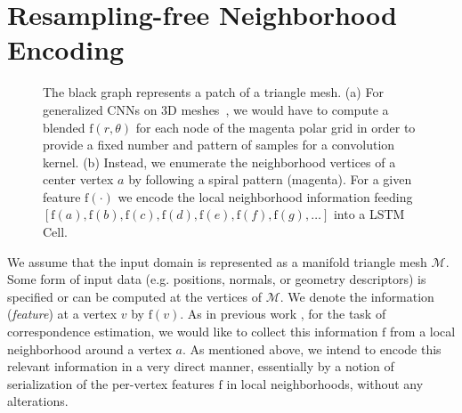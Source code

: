 \documentclass[runningheads]{llncs}
\begin{document}
\section{Resampling-free Neighborhood Encoding}
\begin{figure}[tb]
\centering
{}
\caption{The black graph represents a patch of a triangle mesh. 
(a) For generalized CNNs on 3D meshes~\cite{masci2015geodesic,boscaini2016learning,monti2017geometric}, we would have to compute a blended $\mathrm{f}(r,\theta)$ for each node of the magenta polar grid in order to provide a fixed number and pattern of samples for a convolution kernel.
(b) Instead, we enumerate the neighborhood vertices of a center vertex $a$ by following a spiral pattern (magenta). For a given feature $\mathrm{f}(\cdot)$ we encode the local neighborhood information feeding $[\mathrm{f}(a),\allowbreak\mathrm{f}(b),\allowbreak\mathrm{f}(c),\allowbreak\mathrm{f}(d),\allowbreak\mathrm{f}(e),\allowbreak\mathrm{f}(f),\allowbreak\mathrm{f}(g), \ldots]$ into a LSTM Cell.
}
\label{fig:patch}
\end{figure}

We assume that the input domain is represented as a manifold triangle mesh $\mathcal{M}$. 
Some form of input data (e.g. positions, normals, or geometry descriptors) is specified or can be computed at the vertices of $\mathcal{M}$. We denote the information (\emph{feature}) at a vertex $v$ by $\allowbreak\mathrm{f}(v)$.
As in previous work \cite{masci2015geodesic,boscaini2016learning,monti2017geometric}, for the task of correspondence estimation, we would like to collect this information $\mathrm{f}$ from a local neighborhood around a vertex $a$. As mentioned above, we intend to encode this relevant information in a very direct manner, essentially by a notion of serialization of the per-vertex features $\mathrm{f}$ in local neighborhoods, without any alterations.
 
\end{document}
